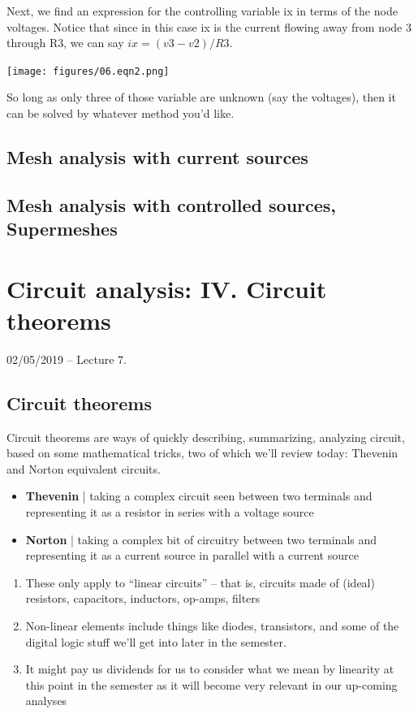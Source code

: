 \documentclass[11pt]{book}
\begin{document}
Next, we find an expression for the controlling variable ix in terms of the node voltages. Notice that since in this case ix is the current flowing away from node 3 through R3, we can say $ix = (v3 - v2)/R3$.
\begin{center}
	\texttt{[image: figures/06.eqn2.png]}
\end{center}

So long as only three of those variable are unknown (say the voltages), then it can be solved by whatever method you’d like.

\section{Mesh analysis with current sources}
\section{Mesh analysis with controlled sources, \textbf{Supermeshes}}



\chapter{Circuit analysis: IV. Circuit theorems}
02/05/2019 – Lecture 7. 
\minitoc
\newpage
\section{Circuit theorems}
Circuit theorems are ways of quickly describing, summarizing, analyzing circuit, based on some mathematical tricks, two of which we’ll review today: Thevenin and Norton equivalent circuits. 
\begin{itemize}
	\item \textbf{Thevenin} | taking a complex circuit seen between two terminals and representing it as a resistor in series with a voltage source
	\item \textbf{Norton} | taking a complex bit of circuitry between two terminals and representing it as a current source in parallel with a current source
\end{itemize}

\begin{enumerate}
	\item These only apply to ``linear circuits'' – that is, circuits made of (ideal) resistors, capacitors, inductors, op-amps, filters
	\item Non-linear elements include things like diodes, transistors, and some of the digital logic stuff we’ll get into later in the semester.
	\item It might pay us dividends for us to consider what we mean by linearity at this point in the semester as it will become very relevant in our up-coming analyses
\end{enumerate}
\end{document}

